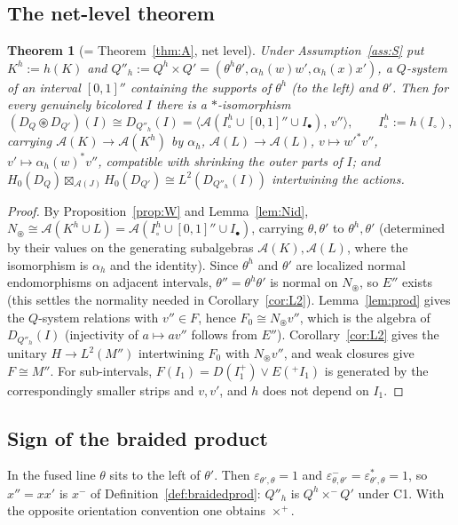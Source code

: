\documentclass[11pt]{article}
\newtheorem{theorem}{Theorem}[section]
\theoremstyle{definition}
\theoremstyle{remark}
\newcommand{\cA}{\mathcal A}
\newcommand{\fus}{\boxtimes}
\newcommand{\cfus}{\circledast}
\begin{document}
\subsection{The net-level theorem}

\begin{theorem}[= Theorem~\ref{thm:A}, net level]\label{thm:net}
Under Assumption~\ref{ass:S} put $K^h:=h(K)$ and $Q''_h:=Q^h\times Q'=(\theta^h\theta',\alpha_h(w)w',\alpha_h(x)x')$, a $Q$-system of an interval $[0,1]''$ containing the supports of $\theta^h$ (to the left) and $\theta'$. Then for every genuinely bicolored $I$ there is a $*$-isomorphism
\[
(D_Q\cfus D_{Q'})(I)\cong D_{Q''_h}(I)=\big\langle\cA(I^h_\circ\cup[0,1]''\cup I_\bullet),\,v''\big\rangle,\qquad I^h_\circ:=h(I_\circ),
\]
carrying $\cA(K)\to\cA(K^h)$ by $\alpha_h$, $\cA(L)\to\cA(L)$, $v\mapsto w'^*v''$, $v'\mapsto\alpha_h(w)^*v''$, compatible with shrinking the outer parts of $I$; and $H_0(D_Q)\fus_{\cA(J)}H_0(D_{Q'})\cong L^2(D_{Q''_h}(I))$ intertwining the actions.
\end{theorem}
\begin{proof}
By Proposition~\ref{prop:W} and Lemma~\ref{lem:Nid}, $N_\circledast\cong\cA(K^h\cup L)=\cA(I^h_\circ\cup[0,1]''\cup I_\bullet)$, carrying $\theta,\theta'$ to $\theta^h,\theta'$ (determined by their values on the generating subalgebras $\cA(K),\cA(L)$, where the isomorphism is $\alpha_h$ and the identity). Since $\theta^h$ and $\theta'$ are localized normal endomorphisms on adjacent intervals, $\theta''=\theta^h\theta'$ is normal on $N_\circledast$, so $E''$ exists (this settles the normality needed in Corollary~\ref{cor:L2}). Lemma~\ref{lem:prod} gives the $Q$-system relations with $v''\in F$, hence $F_0\cong N_\circledast v''$, which is the algebra of $D_{Q''_h}(I)$ (injectivity of $a\mapsto av''$ follows from $E''$). Corollary~\ref{cor:L2} gives the unitary $H\to L^2(M'')$ intertwining $F_0$ with $N_\circledast v''$, and weak closures give $F\cong M''$. For sub-intervals, $F(I_1)=D(I_1^+)\vee E({}^+I_1)$ is generated by the correspondingly smaller strips and $v,v'$, and $h$ does not depend on $I_1$.
\end{proof}

\subsection{Sign of the braided product}\label{sec:sign}
In the fused line $\theta$ sits to the left of $\theta'$. Then $\varepsilon_{\theta',\theta}=1$ and $\varepsilon^-_{\theta,\theta'}=\varepsilon_{\theta',\theta}^*=1$, so $x''=xx'$ is $x^-$ of Definition~\ref{def:braidedprod}: $Q''_h$ is $Q^h\times^-Q'$ under C1. With the opposite orientation convention one obtains $\times^+$.
\end{document}
